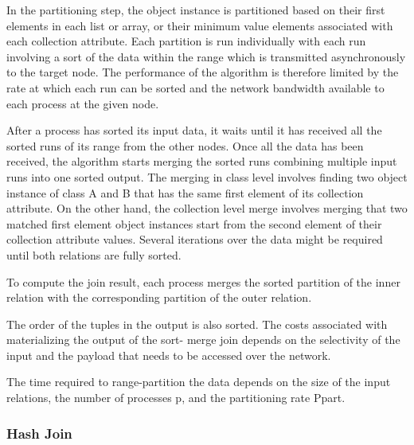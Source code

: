 \documentclass[10pt,twocolumn]{witseiepaper}
\begin{document}
In the partitioning step, the object instance is partitioned based on their first elements in each list or array, or their minimum value elements associated with each collection attribute. Each partition is run individually with each run involving a sort of the data within the range which is transmitted asynchronously to the target node. The performance of the algorithm is therefore limited by the rate at which each run can be sorted and the network bandwidth available to each process at the given node.

After a process has sorted its input data, it waits until it has received all the sorted runs of its range from the other nodes. Once all the data has been received, the algorithm starts merging the sorted runs combining multiple input runs into one sorted output. The merging in class level involves finding two object instance of class A and B that has the same first element of its collection attribute. On the other hand, the collection level merge involves merging that two matched first element object instances start from the second element of their collection attribute values. Several iterations over the data might be required until both relations are fully sorted.

To compute the join result, each process merges the sorted partition of the inner relation with the corresponding partition of the outer relation.

The order of the tuples in the output is also sorted. The costs associated with materializing the output of the sort-
merge join depends on the selectivity of the input and the payload that needs to be accessed over the network.

The time required to range-partition the data depends on the size of the input relations, the number of processes p, and the partitioning rate Ppart.

\subsubsection{Hash Join}
\end{document}
